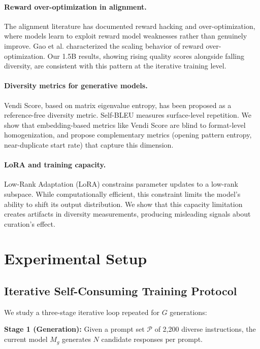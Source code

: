 \documentclass[11pt,a4paper]{article}
\begin{document}
\paragraph{Reward over-optimization in alignment.}
The alignment literature has documented reward hacking and over-optimization, where models learn to exploit reward model weaknesses rather than genuinely improve. Gao et al. characterized the scaling behavior of reward over-optimization. Our 1.5B results, showing rising quality scores alongside falling diversity, are consistent with this pattern at the iterative training level.

\paragraph{Diversity metrics for generative models.}
Vendi Score, based on matrix eigenvalue entropy, has been proposed as a reference-free diversity metric. Self-BLEU measures surface-level repetition. We show that embedding-based metrics like Vendi Score are blind to format-level homogenization, and propose complementary metrics (opening pattern entropy, near-duplicate start rate) that capture this dimension.

\paragraph{LoRA and training capacity.}
Low-Rank Adaptation (LoRA) constrains parameter updates to a low-rank subspace. While computationally efficient, this constraint limits the model's ability to shift its output distribution. We show that this capacity limitation creates artifacts in diversity measurements, producing misleading signals about curation's effect.

\section{Experimental Setup}

\subsection{Iterative Self-Consuming Training Protocol}

We study a three-stage iterative loop repeated for $G$ generations:

\textbf{Stage 1 (Generation):} Given a prompt set $\mathcal{P}$ of 2,200 diverse instructions, the current model $M_g$ generates $N$ candidate responses per prompt.
\end{document}
